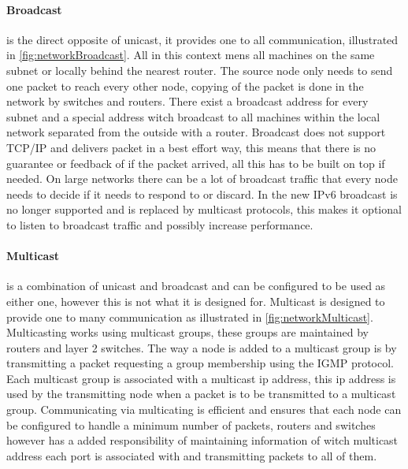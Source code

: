 \paragraph{Broadcast} is the direct opposite of unicast, it provides one to all communication, illustrated in \cref{fig:networkBroadcast}. All in this context mens all machines on the same subnet or locally behind the nearest router.
The source node only needs to send one packet to reach every other node, copying of the packet is done in the network by switches and routers.
There exist a broadcast address for every subnet and a special address witch broadcast to all machines within the local network separated from the outside with a router.
Broadcast does not support TCP/IP and delivers packet in a best effort way, this means that there is no guarantee or feedback of if the packet arrived, all this has to be built on top if needed.
On large networks there can be a lot of broadcast traffic that every node needs to decide if it needs to respond to or discard.
In the new IPv6 broadcast is no longer supported \cite{RFC4291_AddressingIPv6Draft} and is replaced by multicast protocols, this makes it optional to listen to broadcast traffic and possibly increase performance.

\paragraph{Multicast} is a combination of unicast and broadcast and can be configured to be used as either one, however this is not what it is designed for. Multicast is designed to provide one to many communication as illustrated in \cref{fig:networkMulticast}.
Multicasting works using multicast groups, these groups are maintained by routers and layer 2 switches. The way a node is added to a multicast group is by transmitting a packet requesting a group membership using the IGMP protocol. Each multicast group is associated with a multicast ip address, this ip address is used by the transmitting node when a packet is to be transmitted to a multicast group.
Communicating via multicating is efficient and ensures that each node can be configured to handle a minimum number of packets, routers and switches however has a added responsibility of maintaining information of witch multicast address each port is associated with and transmitting packets to all of them.

